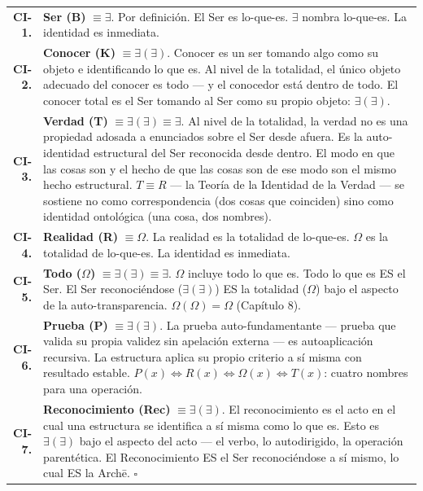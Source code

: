 \documentclass[10pt, openany, oneside]{book}
\renewcommand{\footnotesize}{\fontsize{8.5}{11}\selectfont}
\begin{document}
{\footnotesize
\noindent\begin{tabular}{r p{}}
\textbf{CI-1.} & \textbf{Ser (B)} $\equiv \exists$. Por definición. El Ser es lo-que-es. $\exists$ nombra lo-que-es. La identidad es inmediata. \\[0.5em]

\textbf{CI-2.} & \textbf{Conocer (K)} $\equiv \exists(\exists)$. Conocer es un ser tomando algo como su objeto e identificando lo que es. Al nivel de la totalidad, el único objeto adecuado del conocer es todo --- y el conocedor está dentro de todo. El conocer total es el Ser tomando al Ser como su propio objeto: $\exists(\exists)$. \\[0.5em]

\textbf{CI-3.} & \textbf{Verdad (T)} $\equiv \exists(\exists) \equiv \exists$. Al nivel de la totalidad, la verdad no es una propiedad adosada a enunciados sobre el Ser desde afuera. Es la auto-identidad estructural del Ser reconocida desde dentro. El modo en que las cosas son y el hecho de que las cosas son de ese modo son el mismo hecho estructural. $T \equiv R$ --- la Teoría de la Identidad de la Verdad --- se sostiene no como correspondencia (dos cosas que coinciden) sino como identidad ontológica (una cosa, dos nombres). \\[0.5em]

\textbf{CI-4.} & \textbf{Realidad (R)} $\equiv \Omega$. La realidad es la totalidad de lo-que-es. $\Omega$ es la totalidad de lo-que-es. La identidad es inmediata. \\[0.5em]

\textbf{CI-5.} & \textbf{Todo ($\Omega$)} $\equiv \exists(\exists) \equiv \exists$. $\Omega$ incluye todo lo que es. Todo lo que es ES el Ser. El Ser reconociéndose ($\exists(\exists)$) ES la totalidad ($\Omega$) bajo el aspecto de la auto-transparencia. $\Omega(\Omega) = \Omega$ (Capítulo 8). \\[0.5em]

\textbf{CI-6.} & \textbf{Prueba (P)} $\equiv \exists(\exists)$. La prueba auto-fundamentante --- prueba que valida su propia validez sin apelación externa --- es autoaplicación recursiva. La estructura aplica su propio criterio a sí misma con resultado estable. $P(x) \iff R(x) \iff \Omega(x) \iff T(x)$: cuatro nombres para una operación. \\[0.5em]

\textbf{CI-7.} & \textbf{Reconocimiento (Rec)} $\equiv \exists(\exists)$. El reconocimiento es el acto en el cual una estructura se identifica a sí misma como lo que es. Esto es $\exists(\exists)$ bajo el aspecto del acto --- el verbo, lo autodirigido, la operación parentética. El Reconocimiento ES el Ser reconociéndose a sí mismo, lo cual ES la Arch\={e}. $\square$ \\[0.5em]
\end{tabular}
}
\end{document}

